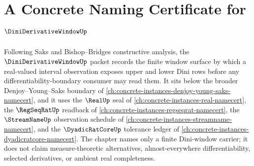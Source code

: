 \chapter{A Concrete Naming Certificate for $\DiniDerivativeWindowUp$}
\label{ch:concrete-instances-dini-derivative-window-namecert}

Following Saks and Bishop--Bridges constructive analysis, the $\DiniDerivativeWindowUp$ packet records the finite window surface by which a real-valued interval observation exposes upper and lower Dini rows before any differentiability-boundary consumer may read them. It sits below the broader Denjoy--Young--Saks boundary of \autoref{ch:concrete-instances-denjoy-young-saks-namecert}, and it uses the $\RealUp$ seal of \autoref{ch:concrete-instances-real-namecert}, the $\RegSeqRatUp$ readback of \autoref{ch:concrete-instances-regseqrat-namecert}, the $\StreamNameUp$ observation schedule of \autoref{ch:concrete-instances-streamname-namecert}, and the $\DyadicRatCoreUp$ tolerance ledger of \autoref{ch:concrete-instances-dyadicratcore-namecert}. The chapter names only a finite Dini-window carrier; it does not claim measure-theoretic alternatives, almost-everywhere differentiability, selected derivatives, or ambient real completeness.

